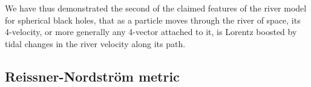 \documentclass[twocolumn,showpacs,preprintnumbers,amsmath,amssymb,prb]{revtex4}
\begin{document}


We have thus demonstrated the second of the claimed features
of the river model for spherical black holes,
that as a particle moves through the river of space,
its 4-velocity, or more generally any 4-vector attached to it,
is Lorentz boosted by tidal changes in the river velocity along its path.

\subsection{Reissner-Nordstr\"om metric}
\label{reissnernordstrom}
\end{document}
